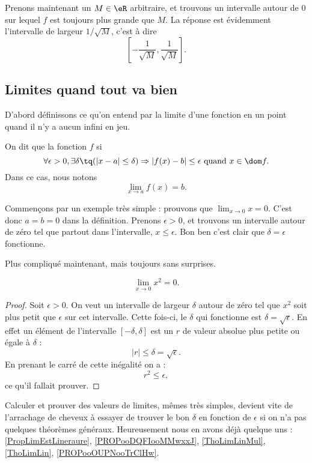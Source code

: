 Prenons maintenant un $M\in\eR$ arbitraire, et trouvons un intervalle autour de $0$ sur lequel $f$ est toujours plus grande que $M$. La réponse est évidemment l'intervalle de largeur $1/\sqrt{M}$, c'est à dire
\[
  \left[ -\frac{ 1 }{ \sqrt{M} },\frac{ 1 }{ \sqrt{M} } \right].
\]

\subsection{Limites quand tout va bien}

D'abord définissons ce qu'on entend par la limite d'une fonction en un point quand il n'y a aucun infini en jeu.
\begin{definition}      \label{DefLimPointSansInfini}
 On dit que la fonction $f$  si
\[
  \forall \epsilon>0,\exists\delta\tq (| x-a |\leq\delta)\Rightarrow | f(x)-b |\leq \epsilon\text{ quand }x\in\dom f.
\]
Dans ce cas, nous notons
\begin{equation}
\lim_{x\to a}f(x)=b.
\end{equation}
\end{definition}

Commençons par un exemple très simple : prouvons que $\lim_{x\to 0}x=0$. C'est donc $a=b=0$ dans la définition. Prenons $\epsilon>0$, et trouvons un intervalle autour de zéro tel que partout dans l'intervalle, $x\leq \epsilon$. Bon ben c'est clair que $\delta=\epsilon$ fonctionne.

Plus compliqué maintenant, mais toujours sans surprises.

\begin{proposition}
\[
  \lim_{x\to 0}x^2=0.
\]

\end{proposition}

\begin{proof}
Soit $\epsilon>0$. On veut un intervalle de largeur $\delta$ autour de zéro tel que $x^2$ soit plus petit que $\epsilon$ sur cet intervalle. Cette fois-ci, le $\delta$ qui fonctionne est $\delta=\sqrt{\epsilon}$. En effet un élément de l'intervalle $[-\delta,\delta]$ est un $r$ de valeur absolue plus petite ou égale à $\delta$ :
\[
| r |\leq\delta=\sqrt{\epsilon}.
\]
En prenant le carré de cette inégalité on a :
\[
  r^2\leq\epsilon,
\]
ce qu'il fallait prouver.
\end{proof}

Calculer et prouver des valeurs de limites, mêmes très simples, devient vite de l'arrachage de cheveux à essayer de trouver le bon $\delta$ en fonction de $\epsilon$ si on n'a pas quelques théorèmes généraux. Heureusement nous en avons déjà quelque uns : \ref{PropLimEstLineraure}, \ref{PROPooDQFIooMMwxxJ}, \ref{ThoLimLinMul}, \ref{ThoLimLin}, \ref{PROPooOUPNooTrClHw}.


